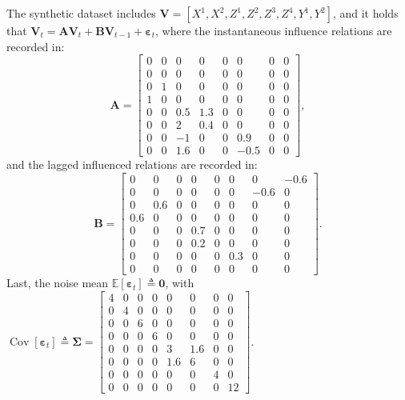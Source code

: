 \documentclass{article}
\theoremstyle{plain}
\theoremstyle{definition}
\theoremstyle{remark}
\def \V {\mathbf{V}}
\def \A {\mathbf{A}}
\def \V {\mathbf{V}}
\def \B {\mathbf{B}}
\begin{document}
The synthetic dataset includes \(\V=[X^1, X^2, Z^1, Z^2, Z^3, Z^4, Y^1, Y^2]\), and it holds that \(\V_{t} = \A\V_{t} + \B\V_{t-1} + \bm{\varepsilon}_{t}\), where the instantaneous influence relations are recorded in: 
\[
  \A = \begin{bmatrix}
    0 & 0 & 0 & 0 & 0 & 0 & 0 & 0 \\
    0 & 0 & 0 & 0 & 0 & 0 & 0 & 0 \\
    0 & 1 & 0 & 0 & 0 & 0 & 0 & 0 \\
    1 & 0 & 0 & 0 & 0 & 0 & 0 & 0 \\
    0 & 0 & 0.5 & 1.3 & 0 & 0 & 0 & 0 \\
    0 & 0 & 2 & 0.4 & 0 & 0 & 0 & 0 \\
    0 & 0 & -1 & 0 & 0 & 0.9 & 0 & 0 \\
    0 & 0 & 1.6 & 0 & 0 & -0.5 & 0 & 0
    \end{bmatrix},\]
  and the lagged influenced relations are recorded in:
    \[
    \B=\begin{bmatrix}
      0 & 0 & 0 & 0 & 0 & 0 & 0 & -0.6 \\
      0 & 0 & 0 & 0 & 0 & 0 & -0.6 & 0 \\
      0 & 0.6 & 0 & 0 & 0 & 0 & 0 & 0 \\
      0.6 & 0 & 0 & 0 & 0 & 0 & 0 & 0 \\
      0 & 0 & 0 & 0.7 & 0 & 0 & 0 & 0 \\
      0 & 0 & 0 & 0.2 & 0 & 0 & 0 & 0 \\
      0 & 0 & 0 & 0 & 0 & 0.3 & 0 & 0 \\
      0 & 0 & 0 & 0 & 0 & 0 & 0 & 0
      \end{bmatrix}.
\]
Last, the noise mean \(\mathbb{E}[\bm{\varepsilon}_{t}] \triangleq \bm{0}\), with 
\(\operatorname{Cov}[\bm{\varepsilon}_{t}] \triangleq 
  \bm{\Sigma} = \begin{bmatrix}
    4 & 0 & 0 & 0 & 0 & 0 & 0 & 0 \\
    0 & 4 & 0 & 0 & 0 & 0 & 0 & 0 \\
    0 & 0 & 6 & 0 & 0 & 0 & 0 & 0 \\
    0 & 0 & 0 & 6 & 0 & 0 & 0 & 0 \\
    0 & 0 & 0 & 0 & 3 & 1.6 & 0 & 0 \\
    0 & 0 & 0 & 0 & 1.6 & 6 & 0 & 0 \\
    0 & 0 & 0 & 0 & 0 & 0 & 4 & 0 \\
    0 & 0 & 0 & 0 & 0 & 0 & 0 & 12
    \end{bmatrix}
\).
\end{document}
